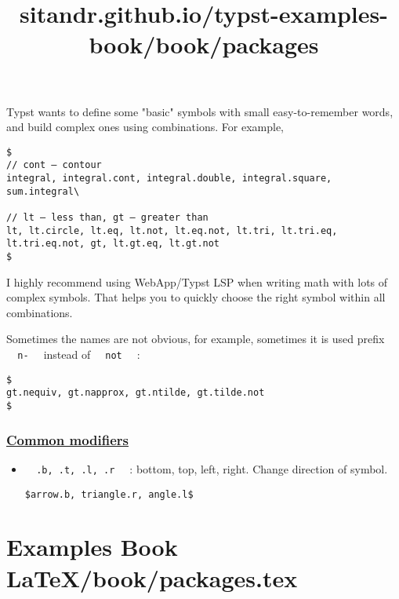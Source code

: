 Typst wants to define some "basic" symbols with small easy-to-remember
words, and build complex ones using combinations. For example,

\begin{verbatim}
$
// cont — contour
integral, integral.cont, integral.double, integral.square, sum.integral\

// lt — less than, gt — greater than
lt, lt.circle, lt.eq, lt.not, lt.eq.not, lt.tri, lt.tri.eq, lt.tri.eq.not, gt, lt.gt.eq, lt.gt.not
$
\end{verbatim}

\pandocbounded{}

I highly recommend using WebApp/Typst LSP when writing math with lots of
complex symbols. That helps you to quickly choose the right symbol
within all combinations.

Sometimes the names are not obvious, for example, sometimes it is used
prefix \texttt{\ }{\texttt{\ n-\ }}\texttt{\ } instead of
\texttt{\ }{\texttt{\ not\ }}\texttt{\ } :

\begin{verbatim}
$
gt.nequiv, gt.napprox, gt.ntilde, gt.tilde.not
$
\end{verbatim}

\pandocbounded{}

\subsubsection{\texorpdfstring{\hyperref[common-modifiers]{Common
modifiers}}{Common modifiers}}\label{common-modifiers}

\begin{itemize}
\item
  \texttt{\ }{\texttt{\ .b,\ .t,\ .l,\ .r\ }}\texttt{\ } : bottom, top,
  left, right. Change direction of symbol.

\begin{verbatim}
$arrow.b, triangle.r, angle.l$
\end{verbatim}

  \pandocbounded{}
\end{itemize}


\section{Examples Book LaTeX/book/packages.tex}
\title{sitandr.github.io/typst-examples-book/book/packages}

